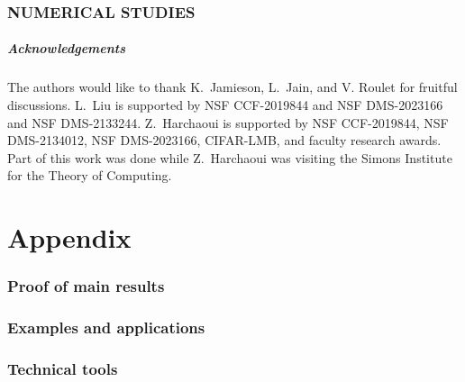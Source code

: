 \documentclass{article}
\begin{document}
\section{NUMERICAL STUDIES}
\label{sec:experiments}



\subsubsection*{Acknowledgements}
The authors would like to thank K.~Jamieson, L.~Jain, and V. Roulet for fruitful discussions.
L.~Liu is supported by NSF CCF-2019844 and NSF DMS-2023166 and NSF DMS-2133244.
Z.~Harchaoui is supported by NSF CCF-2019844, NSF DMS-2134012, NSF DMS-2023166, CIFAR-LMB, and faculty research awards.
Part of this work was done while Z.~Harchaoui was visiting the Simons Institute for the Theory of Computing.

\clearpage




\clearpage
\appendix

\begingroup
\let\clearpage\relax 
\onecolumn 
\endgroup

\part{Appendix} 
\parttoc
\clearpage


\section{Proof of main results}
\label{sec:proofs}


\section{Examples and applications}
\label{sec:example}


\section{Technical tools}
\label{sec:tools}

\end{document}
